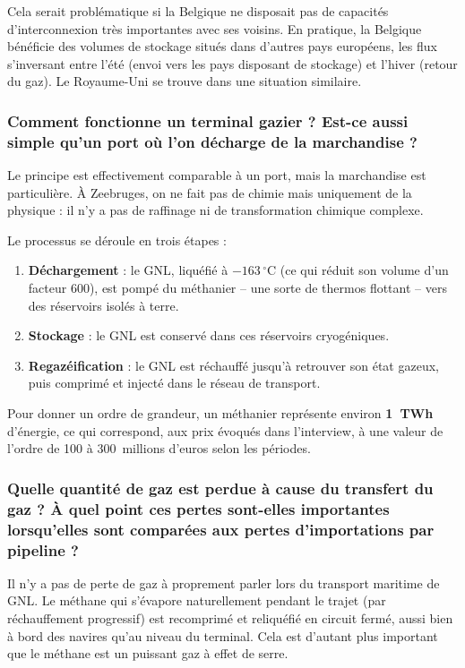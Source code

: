 Cela serait problématique si la Belgique ne disposait pas de capacités d'interconnexion très importantes avec ses voisins. En pratique, la Belgique bénéficie des volumes de stockage situés dans d'autres pays européens, les flux s'inversant entre l'été (envoi vers les pays disposant de stockage) et l'hiver (retour du gaz). Le Royaume-Uni se trouve dans une situation similaire.

\subsubsection{Comment fonctionne un terminal gazier ? Est-ce aussi simple qu'un port où l'on décharge de la marchandise ?}

Le principe est effectivement comparable à un port, mais la marchandise est particulière. À Zeebruges, on ne fait pas de chimie mais uniquement de la physique : il n'y a pas de raffinage ni de transformation chimique complexe.

Le processus se déroule en trois étapes :
\begin{enumerate}
    \item \textbf{Déchargement} : le GNL, liquéfié à $-163\,^\circ$C (ce qui réduit son volume d'un facteur 600), est pompé du méthanier -- une sorte de thermos flottant -- vers des réservoirs isolés à terre.
    \item \textbf{Stockage} : le GNL est conservé dans ces réservoirs cryogéniques.
    \item \textbf{Regazéification} : le GNL est réchauffé jusqu'à retrouver son état gazeux, puis comprimé et injecté dans le réseau de transport.
\end{enumerate}

Pour donner un ordre de grandeur, un méthanier représente environ \textbf{1~TWh} d'énergie, ce qui correspond, aux prix évoqués dans l'interview, à une valeur de l'ordre de 100 à 300~millions d'euros selon les périodes.

\subsubsection{Quelle quantité de gaz est perdue à cause du transfert du gaz ? À quel point ces pertes sont-elles importantes lorsqu'elles sont comparées aux pertes d'importations par pipeline ?}

Il n'y a pas de perte de gaz à proprement parler lors du transport maritime de GNL. Le méthane qui s'évapore naturellement pendant le trajet (par réchauffement progressif) est recomprimé et reliquéfié en circuit fermé, aussi bien à bord des navires qu'au niveau du terminal. Cela est d'autant plus important que le méthane est un puissant gaz à effet de serre.

